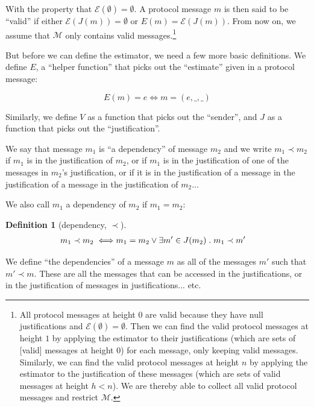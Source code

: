 \documentclass{article}
\theoremstyle{definition}
\newtheorem{defn}{Definition}[section]
\begin{document}
With the property that $\mathcal{E}(\emptyset) = \emptyset$. A protocol message $m$ is then said to be ``valid'' if either $\mathcal{E}(J(m)) = \emptyset$ or $E(m) = \mathcal{E}(J(m))$. From now on, we assume that $\mathcal{M}$ only contains valid messages.\footnote{All protocol messages at height $0$ are valid because they have null justifications and $\mathcal{E}(\emptyset) = \emptyset$. Then we can find the valid protocol messages at height $1$ by applying the estimator to their justifications (which are sets of [valid] messages at height 0) for each message, only keeping valid messages. Similarly, we can find the valid protocol messages at height $n$ by applying the estimator to the justification of these messages (which are sets of valid messages at height $h < n$). We are thereby able to collect all valid protocol messages and restrict $\mathcal{M}.$}


But before we can define the estimator, we need a few more basic definitions. We define $E$, a ``helper function'' that picks out the ``estimate'' given in a protocol message:

$$
E(m) = e \iff m = (e, \_, \_)
$$

Similarly, we define $V$ as a function that picks out the ``sender'', and $J$ as a function that picks out the ``justification''.

We say that message $m_1$ is ``a dependency'' of message $m_2$ and we write $m_1 \prec m_2$ if $m_1$ is in the justification of $m_2$, or if $m_1$ is in the justification of one of the messages in $m_2$'s justification, or if it is in the justification of a message in the justification of a message in the justification of $m_2$...

We also call $m_1$ a dependency of $m_2$ if $m_1 = m_2$:

\begin{defn}[dependency, $\prec$]
\begin{equation*}
\begin{split}
m_1 \prec m_2 \iff & m_1 = m_2 \lor \exists m' \in J(m_2) \hspace{1mm} . \hspace{1mm} m_1 \prec m'
\end{split}
\end{equation*}
\end{defn}

We define ``the dependencies'' of a message $m$ as all of the messages $m'$ such that $m' \prec m$. These are all the messages that can be accessed in the justifications, or in the justification of messages in justifications... etc.
\end{document}
